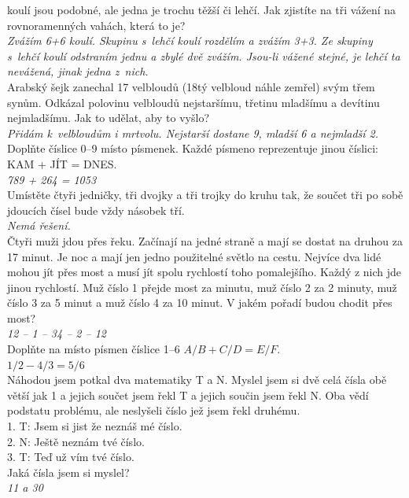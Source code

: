 \begin{multicols}{\value{columnsgames}}
 koulí jsou podobné, ale jedna je trochu těžší či lehčí. 
Jak zjistíte na tři vážení na rovnoramenných vahách, která to
je?\\[1 mm]
{\sl Zvážím 6+6 koulí. Skupinu s~lehčí koulí rozdělím a 
zvážím 3+3. Ze skupiny s~lehčí koulí odstraním jednu a 
zbylé dvě zvážím. Jsou-li vážené stejné, je lehčí ta nevážená, 
jinak jedna z~nich.}\\

\noindent
Arabský šejk zanechal 17 velbloudů (18tý velbloud náhle zemřel) 
svým třem synům. Odkázal polovinu velbloudů nejstaršímu, třetinu 
mladšímu a devítinu nejmladšímu. Jak to udělat, aby to vyšlo?\\[1 mm]
{\sl Přidám k~velbloudům i mrtvolu. Nejstarší dostane 9, 
mladší 6 a nejmladší 2.}\\

\noindent
Doplňte číslice 0--9 místo písmenek. Každé písmeno reprezentuje 
jinou číslici: KAM + JÍT = DNES.\\[1 mm]
{\sl 789 + 264 = 1053}\\

\noindent
Umístěte čtyři jedničky, tři dvojky a tři trojky do kruhu 
tak, že součet tři po sobě jdoucích čísel bude vždy násobek
tří.\\[1 mm]
{\sl Nemá řešení.}\\

\noindent
Čtyři muži jdou přes řeku. Začínají na jedné straně a mají 
se dostat na druhou za 17 minut. Je noc a mají jen jedno použitelné 
světlo na cestu. Nejvíce dva lidé mohou jít přes most a musí 
jít spolu rychlostí toho pomalejšího. Každý z nich jde jinou 
rychlostí. Muž číslo 1 přejde most za minutu, muž číslo 2 za 
2 minuty, muž číslo 3 za 5 minut a muž číslo 4 za 10 minut. V 
jakém pořadí budou chodit přes most?\\[1 mm]
{\sl 12 -- 1 -- 34 -- 2 -- 12}\\

\noindent
Doplňte na místo písmen číslice 1--6 $A/B+C/D=E/F$.\\[1 mm]
{\sl $1/2 - 4/3 = 5/6$}\\

\noindent
Náhodou jsem potkal dva matematiky T a N. Myslel jsem si 
dvě celá čísla obě větší jak 1 a jejich součet jsem řekl T a 
jejich součin jsem řekl N. Oba vědí podstatu problému, ale neslyšeli 
číslo jež jsem řekl druhému.\\
1. T: Jsem si jist že neznáš mé číslo.\\
2. N: Ještě neznám tvé číslo.\\
3. T: Teď už vím tvé číslo.\\
Jaká čísla jsem si myslel?\\[1 mm]
{\sl 11 a 30}\\


\end{multicols}
